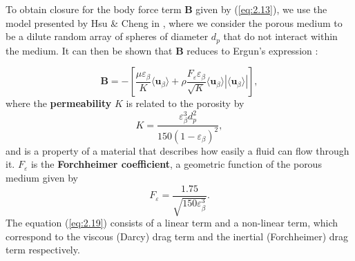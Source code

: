 \documentclass[a4paper, 11pt]{report}
\begin{document}
To obtain closure for the body force term $\mathbf{B}$ given by (\ref{eq:2.13}), we use the model presented by Hsu \& Cheng in \cite{hsu+cheng}, where we consider the porous medium to be a dilute random array of spheres of diameter $d_p$ that do not interact within the medium. It can then be shown that $\mathbf{B}$ reduces to Ergun's expression \cite{ergun}:

\begin{equation}
    \mathbf{B} = -\left[\frac{\mu\varepsilon_\beta}{K}\langle\mathbf{u}_\beta\rangle + \rho\frac{F_\varepsilon\varepsilon_\beta}{\sqrt{K}}\langle\mathbf{u}_\beta\rangle\left|\langle\mathbf{u}_\beta\rangle\right|\right], \label{eq:2.19}
\end{equation}
where the \textbf{permeability} $K$ is related to the porosity by
\begin{equation}
    K = \frac{\varepsilon_\beta^3 d_p^2}{150(1-\varepsilon_\beta)^2}, \label{eq:2.20}
\end{equation}
and is a property of a material that describes how easily a fluid can flow through it. $F_\varepsilon$ is the \textbf{Forchheimer coefficient}, a geometric function of the porous medium given by
\begin{equation}
    F_\varepsilon = \frac{1.75}{\sqrt{150\varepsilon_\beta^3}}. \label{eq:2.21}
\end{equation}
The equation (\ref{eq:2.19}) consists of a linear term and a non-linear term, which correspond to the viscous (Darcy) drag term and the inertial (Forchheimer) drag term respectively. 
\end{document}
